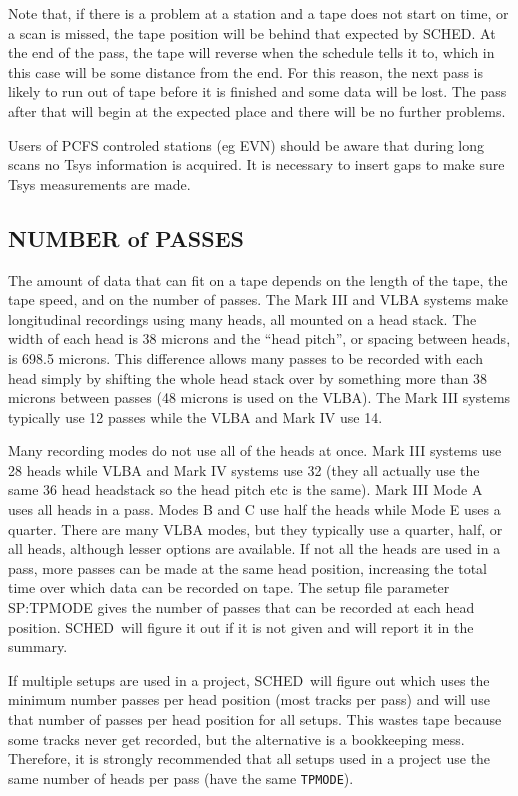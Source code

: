 \documentclass{report}
\newcommand{\sched}{{\sc SCHED}}
\newcommand{\schedb}{{\sc SCHED~}}
\begin{document}
Note that, if there is a problem at a station and a tape does not
start on time, or a scan is missed, the tape position will be behind
that expected by \sched.  At the end of the pass, the tape will reverse
when the schedule tells it to, which in this case will be some distance
from the end.  For this reason, the next pass is likely to run out of
tape before it is finished and some data will be lost.  The pass after
that will begin at the expected place and there will be no further
problems.

Users of PCFS controled stations (eg EVN) should be aware that during
long scans no Tsys information is acquired. It is necessary to insert
gaps to make sure Tsys measurements are made.

\subsection{\label{SSSEC:NUMPASSES}NUMBER of PASSES}

The amount of data that can fit on a tape depends on the length
of the tape, the tape speed, and on the number of passes.  The
Mark III and VLBA systems make longitudinal recordings using many
heads, all mounted on a head stack.  The width of each head is 38
microns and the ``head pitch'', or spacing between heads, is
698.5 microns.  This difference allows many passes to be recorded
with each head simply by shifting the whole head stack over by
something more than 38 microns between passes (48 microns is used
on the VLBA).  The Mark III systems typically use 12 passes while
the VLBA and Mark IV use 14.

Many recording modes do not use all of the heads at once.  Mark III
systems use 28 heads while VLBA and Mark IV systems use 32 (they all
actually use the same 36 head headstack so the head pitch etc is the
same).  Mark III Mode A uses all heads in a pass.  Modes B and C use
half the heads while Mode E uses a quarter.  There are many VLBA
modes, but they typically use a quarter, half, or all heads, although
lesser options are available.  If not all the heads are used in a
pass, more passes can be made at the same head position, increasing
the total time over which data can be recorded on tape.  The setup
file parameter  {SP:TPMODE} gives the number of
passes that can be recorded at each head position.  \schedb will
figure it out if it is not given and will report it in the summary.

If multiple setups are used in a project, \schedb will figure out
which uses the minimum number passes per head position (most
tracks per pass) and will use that number of passes per head position
for all setups.  This wastes tape because some tracks never get
recorded, but the alternative is a bookkeeping mess.  Therefore,
it is strongly recommended that all setups used in a project use
the same number of heads per pass (have the same {\tt TPMODE}).
\end{document}
